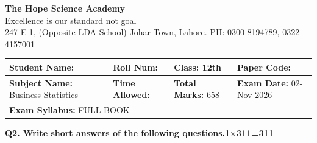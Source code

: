 \documentclass[11pt,a4paper]{article}
\begin{document}
\begin{center}
  {\Huge\bfseries The Hope Science Academy}\\[3pt]
  {\small Excellence is our standard not goal}\\[2pt]
  {\small 247-E-1, (Opposite LDA School) Johar Town, Lahore. PH: 0300-8194789, 0322-4157001}
\end{center}
\medskip\noindent
\begin{tabularx}{\linewidth}{|X|X|X|X|}
\hline
\textbf{Student Name:} & \textbf{Roll Num:} & \textbf{Class:} 12th & \textbf{Paper Code:} \\ \hline
\textbf{Subject Name:} Business Statistics & \textbf{Time Allowed:} & \textbf{Total Marks:} 658 & \textbf{Exam Date:} 02-Nov-2026 \\ \hline
\multicolumn{4}{|l|}{\textbf{Exam Syllabus:} FULL BOOK} \\ \hline
\end{tabularx}
\bigskip
\noindent\textbf{Q2. Write short answers of the following questions.}\hfill\textbf{1$\times$311=311}
\end{document}
